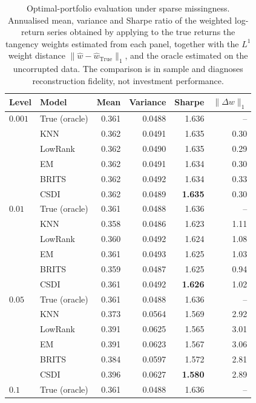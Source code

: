 \begin{table}[htbp]
  \centering
  \footnotesize
  \caption[Optimal-portfolio evaluation under sparse missingness]{Optimal-portfolio evaluation under sparse missingness. Annualised mean, variance and Sharpe ratio of the weighted log-return series obtained by applying to the true returns the tangency weights estimated from each panel, together with the $L^1$ weight distance $\lVert \hat w - \hat w_{\text{True}}\rVert_1$, and the oracle estimated on the uncorrupted data. The comparison is in sample and diagnoses reconstruction fidelity, not investment performance.}
  \label{tab:portfolio_sparses}
  \begin{tabular}{llrrrr}
    \toprule
    Level & Model & Mean & Variance & Sharpe & $\lVert \Delta w\rVert_1$ \\
    \midrule
    $0.001$ & True (oracle) & 0.361 & 0.0488 & 1.636 & -- \\
     & KNN & 0.362 & 0.0491 & 1.635 & 0.30 \\
     & LowRank & 0.362 & 0.0490 & 1.635 & 0.29 \\
     & EM & 0.362 & 0.0491 & 1.634 & 0.30 \\
     & BRITS & 0.362 & 0.0492 & 1.634 & 0.33 \\
     & CSDI & 0.362 & 0.0489 & \textbf{1.635} & 0.30 \\
    \midrule
    $0.01$ & True (oracle) & 0.361 & 0.0488 & 1.636 & -- \\
     & KNN & 0.358 & 0.0486 & 1.623 & 1.11 \\
     & LowRank & 0.360 & 0.0492 & 1.624 & 1.08 \\
     & EM & 0.361 & 0.0493 & 1.625 & 1.03 \\
     & BRITS & 0.359 & 0.0487 & 1.625 & 0.94 \\
     & CSDI & 0.361 & 0.0492 & \textbf{1.626} & 1.02 \\
    \midrule
    $0.05$ & True (oracle) & 0.361 & 0.0488 & 1.636 & -- \\
     & KNN & 0.373 & 0.0564 & 1.569 & 2.92 \\
     & LowRank & 0.391 & 0.0625 & 1.565 & 3.01 \\
     & EM & 0.391 & 0.0623 & 1.567 & 3.06 \\
     & BRITS & 0.384 & 0.0597 & 1.572 & 2.81 \\
     & CSDI & 0.396 & 0.0627 & \textbf{1.580} & 2.89 \\
    \midrule
    $0.1$ & True (oracle) & 0.361 & 0.0488 & 1.636 & -- \\

\end{tabular}
\end{table}
